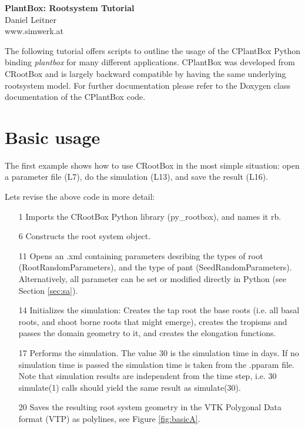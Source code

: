 \documentclass[a4paper]{article}
\begin{document}
\begin{center}
\vspace{0.5 cm}
\huge{\textbf{PlantBox: Rootsystem Tutorial}} \\
\vspace{0.5 cm}
\normalsize
Daniel Leitner \\
www.simwerk.at 
\end{center}

\vspace{0.5 cm}

\noindent 
The following tutorial offers scripts to outline the usage of the CPlantBox Python binding \emph{plantbox} for many different applications. CPlantBox was developed from CRootBox and is largely backward compatible by having the same underlying rootsystem model. For further documentation please refer to the Doxygen class documentation of the CPlantBox code.


\vspace{0.5 cm}

\tableofcontents

\newpage



\section{Basic usage}
 
The first example shows how to use CRootBox in the most simple situation: open a parameter file (L7), do the simulation (L13), and save the result (L16). 


\noindent 
Lets revise the above code in more detail: 
\begin{itemize}
 \item[1] Imports the CRootBox Python library (py\_rootbox), and names it rb.
 \item[6] Constructs the root system object.
 \item[11] Opens an .xml containing parameters desribing the types of root (RootRandomParameters), and the type of pant (SeedRandomParameters). Alternatively, all parameter can be set or modified directly in Python (see Section \ref{sec:sa}).
 \item[14] Initializes the simulation: Creates the tap root the base roots (i.e. all basal roots, and shoot borne roots that might emerge), creates the tropisms and passes the domain geometry to it, and creates the elongation functions. 
 \item[17] Performs the simulation. The value 30 is the simulation time in days. If no simulation time is passed the simulation time is taken from the .pparam file. Note that simulation results are independent from the time step, 
 i.e. 30 simulate(1) calls should yield the same result as simulate(30). 
 \item[20] Saves the resulting root system geometry in the VTK Polygonal Data format (VTP) as polylines, see Figure \ref{fig:basicA}. 
\end{itemize}
\end{document}
